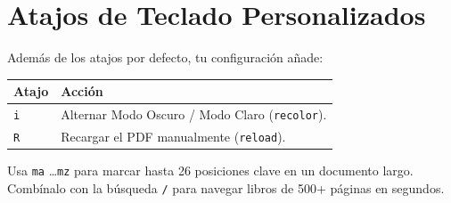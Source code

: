 \documentclass[11pt,article,spanish]{apuntes-scr}
\begin{document}
\section{Atajos de Teclado Personalizados}
Además de los atajos por defecto, tu configuración añade:

\begin{center}
\small
\begin{tabularx}{\linewidth}{l X}
\toprule
\textbf{Atajo} & \textbf{Acción} \\
\midrule
\texttt{i} & Alternar Modo Oscuro / Modo Claro (\texttt{recolor}). \\
\texttt{R} & Recargar el PDF manualmente (\texttt{reload}). \\
\bottomrule
\end{tabularx}
\end{center}

\begin{notabox}
  Usa \texttt{ma} \dots \texttt{mz} para marcar hasta 26 posiciones clave en un documento largo. Combínalo con la búsqueda \texttt{/} para navegar libros de 500+ páginas en segundos.
\end{notabox}

\backmatter
\end{document}
